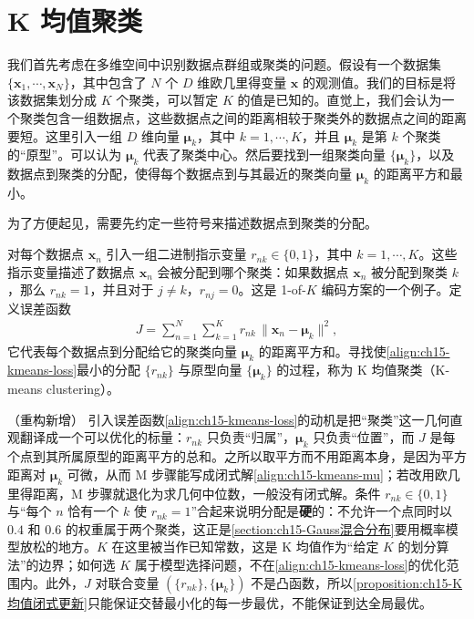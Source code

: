 \documentclass[../../main.tex]{subfiles}
\begin{document}
\section{K 均值聚类}\label{section:ch15-K均值聚类}

我们首先考虑在多维空间中识别数据点群组或聚类的问题。假设有一个数据集 $\{\bm{x}_1,\cdots,\bm{x}_N\}$，其中包含了 $N$ 个 $D$ 维欧几里得变量 $\bm{x}$ 的观测值。我们的目标是将该数据集划分成 $K$ 个聚类，可以暂定 $K$ 的值是已知的。直觉上，我们会认为一个聚类包含一组数据点，这些数据点之间的距离相较于聚类外的数据点之间的距离要短。这里引入一组 $D$ 维向量 $\bm{\mu}_k$，其中 $k=1,\cdots,K$，并且 $\bm{\mu}_k$ 是第 $k$ 个聚类的“原型”。可以认为 $\bm{\mu}_k$ 代表了聚类中心。然后要找到一组聚类向量 $\{\bm{\mu}_k\}$，以及数据点到聚类的分配，使得每个数据点到与其最近的聚类向量 $\bm{\mu}_k$ 的距离平方和最小。

为了方便起见，需要先约定一些符号来描述数据点到聚类的分配。

\begin{definition}[K 均值聚类]\label{definition:ch15-K均值聚类}
对每个数据点 $\bm{x}_n$ 引入一组二进制指示变量 $r_{nk}\in\{0,1\}$，其中 $k=1,\cdots,K$。这些指示变量描述了数据点 $\bm{x}_n$ 会被分配到哪个聚类：如果数据点 $\bm{x}_n$ 被分配到聚类 $k$，那么 $r_{nk}=1$，并且对于 $j\neq k$，$r_{nj}=0$。这是 1-of-$K$ 编码方案的一个例子。定义误差函数
\begin{align}
J=\sum_{n=1}^{N}\sum_{k=1}^{K}r_{nk}\,\|\bm{x}_n-\bm{\mu}_k\|^{2},
\label{align:ch15-kmeans-loss}
\end{align}
它代表每个数据点到分配给它的聚类向量 $\bm{\mu}_k$ 的距离平方和。寻找使\eqref{align:ch15-kmeans-loss}最小的分配 $\{r_{nk}\}$ 与原型向量 $\{\bm{\mu}_k\}$ 的过程，称为 K 均值聚类（K-means clustering）。
\end{definition}

\begin{remark}（重构新增）
引入误差函数\eqref{align:ch15-kmeans-loss}的动机是把“聚类”这一几何直观翻译成一个可以优化的标量：$r_{nk}$ 只负责“归属”，$\bm{\mu}_k$ 只负责“位置”，而 $J$ 是每个点到其所属原型的距离平方的总和。之所以取平方而不用距离本身，是因为平方距离对 $\bm{\mu}_k$ 可微，从而 M 步骤能写成闭式解\eqref{align:ch15-kmeans-mu}；若改用欧几里得距离，M 步骤就退化为求几何中位数，一般没有闭式解。条件 $r_{nk}\in\{0,1\}$ 与“每个 $n$ 恰有一个 $k$ 使 $r_{nk}=1$”合起来说明分配是\textbf{硬}的：不允许一个点同时以 $0.4$ 和 $0.6$ 的权重属于两个聚类，这正是\cref{section:ch15-Gauss混合分布}要用概率模型放松的地方。$K$ 在这里被当作已知常数，这是 K 均值作为“给定 $K$ 的划分算法”的边界；如何选 $K$ 属于模型选择问题，不在\eqref{align:ch15-kmeans-loss}的优化范围内。此外，$J$ 对联合变量 $(\{r_{nk}\},\{\bm{\mu}_k\})$ 不是凸函数，所以\cref{proposition:ch15-K均值闭式更新}只能保证交替最小化的每一步最优，不能保证到达全局最优。
\end{remark}
\end{document}
